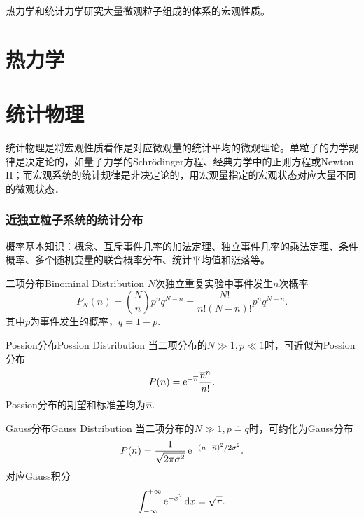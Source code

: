\def\coursename{统计力学}
\def\coursefullname{统计力学}
\def\courseEnglishname{Statistical Mechanics}
\def\teachername{倪军}
\def\beginday{2022/3/25}
\def\endday{2022/6/16}




\let\oldO\O
\newcommand{\Om}[1][\,\!]{\Omega_{\mathrm{#1}}\!\hkh{a_i}}
\newcommand*{\Omm}{\Omega\!\hkh{a_\mathrm m}}
\newcommand*{\tl}{\mathrm t}					%
\newcommand*{\rt}{\mathrm r}					%
\newcommand*{\vb}{\mathrm v}					%
\newcommand*{\tv}{\mathrm t}					%
\newcommand*{\lt}{\mathrm l}					%
\newcommand*{\Db}{\mathrm D}
\newcommand*{\Fm}{\mathrm F}
\newcommand*{\Cr}{\mathrm C}
\newcommand*{\rs}{\mathrm r}
\newcommand*{\st}{\mathrm s}
\newcommand*{\df}{\mathrm d}
\newcommand*{\cll}{\mathrm c}

\DeclareMathOperator{\Debye}{D}
\DeclareMathOperator{\Brill}{B}
\DeclareMathOperator{\Einst}{E}


\firstandforemost

热力学和统计力学研究大量微观粒子组成的体系的宏观性质。
\part{热力学}


\clearpage
\part{统计物理}
统计物理是将宏观性质看作是对应微观量的统计平均的微观理论。单粒子的力学规律是决定论的，如量子力学的Schrödinger方程、经典力学中的正则方程或Newton II；而宏观系统的统计规律是非决定论的，用宏观量指定的宏观状态对应大量不同的微观状态．
\section{近独立粒子系统的统计分布}
概率基本知识：概念、互斥事件几率的加法定理、独立事件几率的乘法定理、条件概率、多个随机变量的联合概率分布、统计平均值和涨落等。
\begin{definition}{二项分布}{Binominal Distribution}
	$N$次独立重复实验中事件发生$n$次概率
	\[
		P_N(n)=\binom Nnp^nq^{N-n}=\frac{N!}{n!(N-n)!}p^nq^{N-n}.
	\]
	其中$p$为事件发生的概率，$q=1-p.$
\end{definition}
\begin{definition}{Possion分布}{Possion Distribution}
	当二项分布的$N\gg 1,p\ll 1$时，可近似为Possion分布
	\[
	P(n)=\mathop{}\!\mathrm{e}^{-\overline n}\frac{\overline n^n}{n!}.
	\]
	Possion分布的期望和标准差均为$\overline n.$
\end{definition}
\begin{definition}{Gauss分布}{Gauss Distribution}
	当二项分布的$N\gg 1,p\doteq q$时，可约化为Gauss分布
	\[
		P(n)=\frac1{\sqrt{2\pi\sigma^2}}\mathop{}\!\mathrm{e}^{-(n-\overline n)^2/2\sigma^2}.
	\]
	对应Gauss积分
	\[
	\int_{-\infty}^{+\infty}\mathop{}\!\mathrm{e}^{-x^2}\mathop{}\!\mathrm{d} x=\sqrt\pi.
\]
\end{definition}
